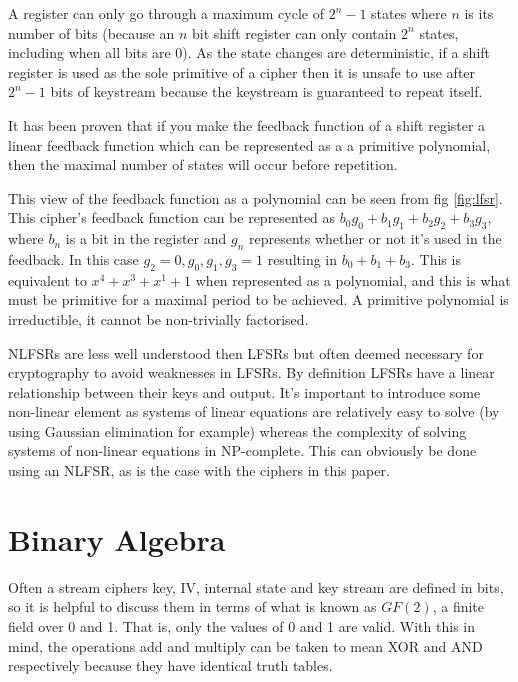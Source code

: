 \documentclass{report}
\let\Oldsection\section
\renewcommand{\section}{\FloatBarrier\Oldsection}
\begin{document}
A register can only go through a maximum cycle of $2^n-1$ states where $n$ is its number of bits (because an $n$ bit shift register can only contain $2^n$ states, including when all bits are 0). As the state changes are deterministic, if a shift register is used as the sole primitive of a cipher then it is unsafe to use after $2^n-1$ bits of keystream because the keystream is guaranteed to repeat itself.

It has been proven that if you make the feedback function of a shift register a linear feedback function which can be represented as a a primitive polynomial, then the maximal number of states will occur before repetition\cite{linearMaximal}.

This view of the feedback function as a polynomial can be seen from fig \ref{fig:lfsr}. This cipher's feedback function can be represented as  $b_0g_0+b_1g_1+b_2g_2+b_3g_3$, where $b_n$ is a bit in the register and $g_n$ represents whether or not it's used in the feedback. In this case $g_2 = 0, g_0, g_1, g_3 = 1$ resulting in $b_0+b_1+b_3$. This is equivalent to $x^4+x^3+x^1+1$ when represented as a polynomial, and this is what must be primitive for a maximal period to be achieved. A primitive polynomial is irreductible, it cannot be non-trivially factorised\cite{primPoly}.

\begin{figure}[!htb]
\end{figure}
NLFSRs are less well understood then LFSRs but often deemed necessary for cryptography to avoid weaknesses in LFSRs. By definition LFSRs have a linear relationship between their keys and output. It's important to introduce some non-linear element as systems of linear equations are relatively easy to solve (by using Gaussian elimination for example\cite{gaussian}) whereas the complexity of solving systems of non-linear equations in NP-complete\cite{NonlinearComp}. This can obviously be done using an NLFSR, as is the case with the ciphers in this paper.

\section{Binary Algebra}
Often a stream ciphers key, IV, internal state and key stream are defined in bits, so it is helpful to discuss them in terms of what is known as $\mathit{GF(2)}$, a finite field over 0 and 1. That is, only the values of 0 and 1 are valid. With this in mind, the operations add and multiply can be taken to mean XOR and AND respectively because they have identical truth tables.
\end{document}

